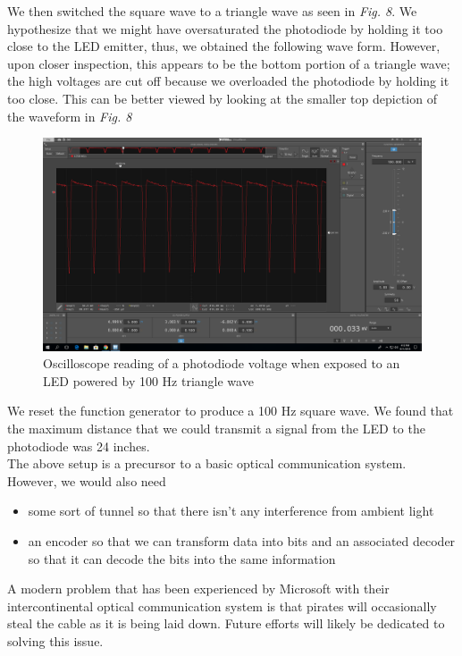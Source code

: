 \documentclass[10pt]{article}
\begin{document}
We then switched the square wave to a triangle wave as seen in \textit{Fig. 8}. We hypothesize that we might have oversaturated the photodiode by holding it too close to the LED emitter, thus, we obtained the following wave form. However, upon closer inspection, this appears to be the bottom portion of a triangle wave; the high voltages are cut off because we overloaded the photodiode by holding it too close. This can be better viewed by looking at the smaller top depiction of the waveform in \textit{Fig. 8}
 \begin{center}
	\begin{figure} [H]
		\centering
		\includegraphics[scale=0.22]{images/opticaltriangle.png}
		\caption{Oscilloscope reading of a photodiode voltage when exposed to an LED powered by 100 Hz triangle wave}
	\end{figure}
\end{center}

We reset the function generator to produce a 100 Hz square wave. We found that the maximum distance that we could transmit a signal from the LED to the photodiode was 24 inches. \\
The above setup is a precursor to a basic optical communication system. However, we would also need 
\begin{itemize}
	\item some sort of tunnel so that there isn't any interference from ambient light
	\item an encoder so that we can transform data into bits and an associated decoder so that it can decode the bits into the same information
\end{itemize}
A modern problem that has been experienced by Microsoft with their intercontinental optical communication system is that pirates will occasionally steal the cable as it is being laid down. Future efforts will likely be dedicated to solving this issue. 
\medskip
\end{document}
